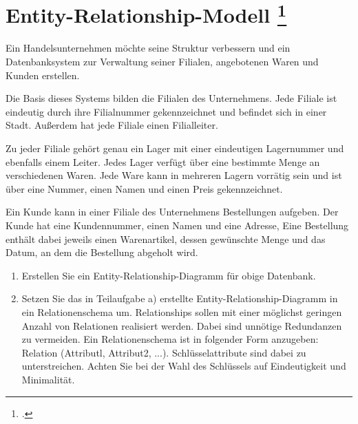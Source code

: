 \documentclass{lehramt-informatik-aufgabe}
\begin{document}
\section{Entity-Relationship-Modell
\footcite{examen:66116:2012:03}
}

Ein Handelsunternehmen möchte seine Struktur verbessern und ein
Datenbanksystem zur Verwaltung seiner Filialen, angebotenen Waren und
Kunden erstellen.

Die Basis dieses Systems bilden die Filialen des Unternehmens. Jede
Filiale ist eindeutig durch ihre Filialnummer gekennzeichnet und
befindet sich in einer Stadt. Außerdem hat jede Filiale einen
Filialleiter.

Zu jeder Filiale gehört genau ein Lager mit einer eindeutigen
Lagernummer und ebenfalls einem Leiter. Jedes Lager verfügt über eine
bestimmte Menge an verschiedenen Waren. Jede Ware kann in mehreren
Lagern vorrätig sein und ist über eine Nummer, einen Namen und einen
Preis gekennzeichnet.

Ein Kunde kann in einer Filiale des Unternehmens Bestellungen aufgeben.
Der Kunde hat eine Kundennummer, einen Namen und eine Adresse, Eine
Bestellung enthält dabei jeweils einen Warenartikel, dessen gewünschte
Menge und das Datum, an dem die Bestellung abgeholt wird.

\begin{enumerate}


\item Erstellen Sie ein Entity-Relationship-Diagramm für obige Datenbank.


\item Setzen Sie das in Teilaufgabe a) erstellte
Entity-Relationship-Diagramm in ein Relationenschema um. Relationships
sollen mit einer möglichst geringen Anzahl von Relationen realisiert
werden. Dabei sind unnötige Redundanzen zu vermeiden. Ein
Relationenschema ist in folgender Form anzugeben: Relation (Attributl,
Attribut2, ...). Schlüsselattribute sind dabei zu unterstreichen. Achten
Sie bei der Wahl des Schlüssels auf Eindeutigkeit und Minimalität.

\end{enumerate}
\end{document}
